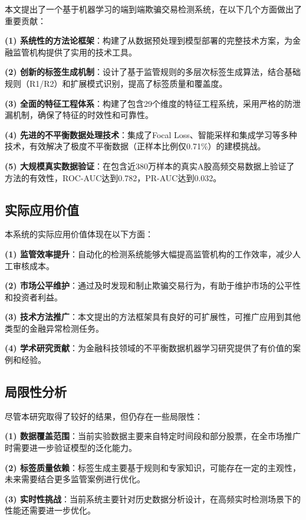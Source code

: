 \documentclass[12pt,a4paper]{article}
\begin{document}
本文提出了一个基于机器学习的端到端欺骗交易检测系统，在以下几个方面做出了重要贡献：

\textbf{(1) 系统性的方法论框架}：构建了从数据预处理到模型部署的完整技术方案，为金融监管机构提供了实用的技术工具。

\textbf{(2) 创新的标签生成机制}：设计了基于监管规则的多层次标签生成算法，结合基础规则（R1/R2）和扩展模式识别，提高了标签质量和覆盖度。

\textbf{(3) 全面的特征工程体系}：构建了包含29个维度的特征工程系统，采用严格的防泄漏机制，确保了特征的时效性和可靠性。

\textbf{(4) 先进的不平衡数据处理技术}：集成了Focal Loss、智能采样和集成学习等多种技术，有效解决了极度不平衡数据（正样本比例仅0.71\%）的建模挑战。

\textbf{(5) 大规模真实数据验证}：在包含近380万样本的真实A股高频交易数据上验证了方法的有效性，ROC-AUC达到0.782，PR-AUC达到0.032。

\subsection{实际应用价值}

本系统的实际应用价值体现在以下方面：

\textbf{(1) 监管效率提升}：自动化的检测系统能够大幅提高监管机构的工作效率，减少人工审核成本。

\textbf{(2) 市场公平维护}：通过及时发现和制止欺骗交易行为，有助于维护市场的公平性和投资者利益。

\textbf{(3) 技术方法推广}：本文提出的方法框架具有良好的可扩展性，可推广应用到其他类型的金融异常检测任务。

\textbf{(4) 学术研究贡献}：为金融科技领域的不平衡数据机器学习研究提供了有价值的案例和经验。

\subsection{局限性分析}

尽管本研究取得了较好的结果，但仍存在一些局限性：

\textbf{(1) 数据覆盖范围}：当前实验数据主要来自特定时间段和部分股票，在全市场推广时需要进一步验证模型的泛化能力。

\textbf{(2) 标签质量依赖}：标签生成主要基于规则和专家知识，可能存在一定的主观性，未来需要结合更多监管案例进行优化。

\textbf{(3) 实时性挑战}：当前系统主要针对历史数据分析设计，在高频实时检测场景下的性能还需要进一步优化。
\end{document}
